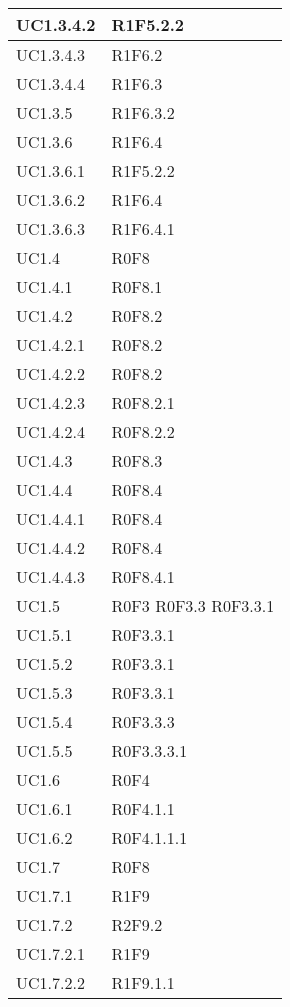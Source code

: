 \begin{center}
\begin{longtable}{| p{4cm} | p{4cm} |}
		\hline
		UC1.3.4.2  &  R1F5.2.2 \\
		\hline
		UC1.3.4.3  &  R1F6.2 \\
		\hline
		UC1.3.4.4  &  R1F6.3 \\
		\hline
		UC1.3.5  &  R1F6.3.2 \\
		\hline
		UC1.3.6  &  R1F6.4 \\
		\hline
		UC1.3.6.1  &  R1F5.2.2 \\
		\hline
		UC1.3.6.2  &  R1F6.4 \\
		\hline
		UC1.3.6.3  &  R1F6.4.1 \\
		\hline
		UC1.4  &  R0F8 \\
		\hline
		UC1.4.1  &  R0F8.1 \\
		\hline
		UC1.4.2  &  R0F8.2 \\
		\hline
		UC1.4.2.1  &  R0F8.2 \\
		\hline
		UC1.4.2.2  &  R0F8.2 \\
		\hline
		UC1.4.2.3  &  R0F8.2.1 \\
		\hline
		UC1.4.2.4  &  R0F8.2.2 \\
		\hline
		UC1.4.3  &  R0F8.3 \\
		\hline
		UC1.4.4  &  R0F8.4 \\
		\hline
		UC1.4.4.1  &  R0F8.4 \\
		\hline
		UC1.4.4.2  &  R0F8.4 \\
		\hline
		UC1.4.4.3  &  R0F8.4.1 \\
		\hline
		UC1.5  &  R0F3 \newline R0F3.3 \newline R0F3.3.1 \\
		\hline
		UC1.5.1  &  R0F3.3.1 \\
		\hline
		UC1.5.2  &  R0F3.3.1 \\
		\hline
		UC1.5.3  &  R0F3.3.1 \\
		\hline
		UC1.5.4  &  R0F3.3.3 \\
		\hline
		UC1.5.5  &  R0F3.3.3.1 \\
		\hline
		UC1.6  &  R0F4 \\
		\hline
		UC1.6.1  &  R0F4.1.1 \\
		\hline
		UC1.6.2  &  R0F4.1.1.1 \\
		\hline
		UC1.7  &  R0F8 \\
		\hline
		UC1.7.1  &  R1F9 \\
		\hline
		UC1.7.2  &  R2F9.2 \\
		\hline
		UC1.7.2.1  &  R1F9 \\
		\hline
		UC1.7.2.2  &  R1F9.1.1 \\

\end{longtable}
\end{center}
